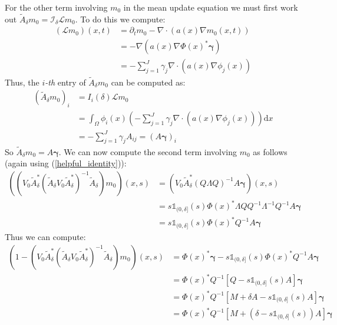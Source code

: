 \documentclass{article}
\theoremstyle{definition}
\theoremstyle{remark}
\theoremstyle{remark}
\begin{document}
\noindent For the other term involving $m_0$ in the mean update equation we must first work out $\tilde{A}_{\delta}m_{0}=\mathcal{I}_{\delta}\mathcal{L}m_{0}$. To do this we compute:
\begin{align*}
    (\mathcal{L}m_{0})(x,t)&=\partial_{t}m_{0}-\nabla\cdot(a(x)\nabla m_{0}(x,t)) \\
    &=-\nabla(a(x)\nabla\Phi(x)^{*}\boldsymbol{\gamma}) \\
    &=-\sum_{j=1}^{J}\gamma_{j}\nabla\cdot(a(x)\nabla\phi_{j}(x))
\end{align*}
Thus, the $i$\textit{-th} entry of $\tilde{A}_{\delta}m_{0}$ can be computed as:
\begin{align*}
    (\tilde{A}_{\delta}m_{0})_{i} &= I_{i}(\delta)\mathcal{L}m_{0} \\
    &= \int_{\Omega}\phi_{i}(x)\left(-\sum_{j=1}^{J}\gamma_{j}\nabla\cdot(a(x)\nabla\phi_{j}(x))\right)\mathrm{d}x \\
    &= -\sum_{j=1}^{J}\gamma_{j}A_{ij} = (A\boldsymbol{\gamma})_{i}
\end{align*}
So $\tilde{A}_{\delta}m_{0}=A\boldsymbol{\gamma}$.
We can now compute the second term involving $m_{0}$ as follows (again using (\ref{helpful_identity})):
\begin{align*}
    ((V_{0}\tilde{A}_{\delta}^{*}(\tilde{A}_{\delta}V_{0}\tilde{A}_{\delta}^{*})^{-1}\tilde{A}_{\delta})m_{0})(x,s) &= (V_{0}\tilde{A}_{\delta}^{*}(Q\Lambda Q)^{-1}A\boldsymbol{\gamma})(x,s) \\
    &= s\mathbb{1}_{(0,\delta]}(s)\Phi(x)^{*}\Lambda QQ^{-1}\Lambda^{-1}Q^{-1}A\boldsymbol{\gamma}\\
    &=s\mathbb{1}_{(0,\delta]}(s)\Phi(x)^{*}Q^{-1}A\boldsymbol{\gamma}
\end{align*}
Thus we can compute:
\begin{align*}
    (1-(V_{0}\tilde{A}_{\delta}^{*}(\tilde{A}_{\delta}V_{0}\tilde{A}_{\delta}^{*})^{-1}\tilde{A}_{\delta})m_{0})(x,s)&=\Phi(x)^{*}\boldsymbol{\gamma}-s\mathbb{1}_{(0,\delta]}(s)\Phi(x)^{*}Q^{-1}A\boldsymbol{\gamma} \\
    &= \Phi(x)^{*}Q^{-1}[Q - s\mathbb{1}_{(0,\delta]}(s)A]\boldsymbol{\gamma} \\
    &=\Phi(x)^{*}Q^{-1}[M+\delta A - s\mathbb{1}_{(0,\delta]}(s)A]\boldsymbol{\gamma} \\
    &=\Phi(x)^{*}Q^{-1}[M + (\delta-s\mathbb{1}_{(0,\delta]}(s))A]\boldsymbol{\gamma}
\end{align*}
\end{document}

